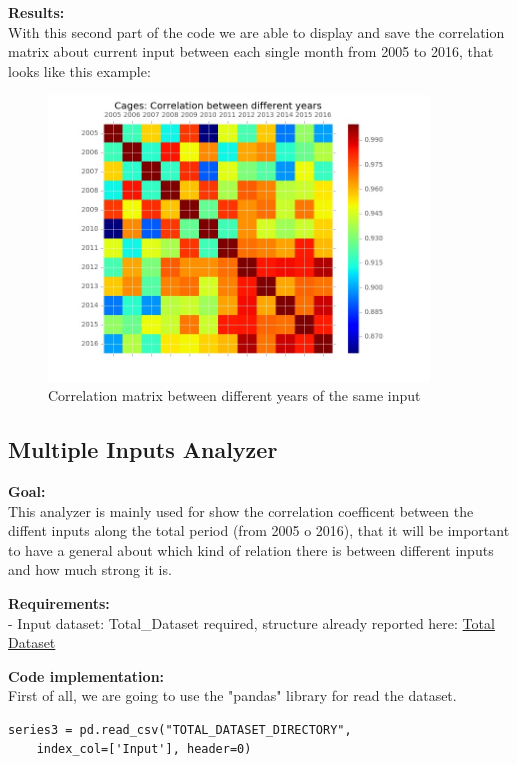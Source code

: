 \begin{minipage}{0.5\textwidth}
\textbf{Results:} \\
With this second part of the code we are able to display and save the correlation matrix about current input between each single month from 2005 to 2016, that looks like this example:
\end{minipage} \hfill
\begin{minipage}{0.45\textwidth}
\begin{figure}[H]
    \includegraphics[width=0.9\textwidth]{Files/Cages_Years_Matrix.jpg}
    \caption{Correlation matrix between different years of the same input}
\end{figure}
\end{minipage}



\newpage
\subsection{Multiple Inputs Analyzer}
\textbf{Goal:}\\
This analyzer is mainly used for show the correlation coefficent between the diffent inputs along the total period (from 2005 o 2016), that it will be important to have a general about which kind of relation there is between different inputs and how much strong it is.

\textbf{Requirements:}\\
- Input dataset: Total\_Dataset required, structure already reported here:
\hyperref[table: Total_Dataset]{Total Dataset}

\textbf{Code implementation:}\\
First of all, we are going to use the "pandas" library for read the dataset.
\begin{lstlisting}
series3 = pd.read_csv("TOTAL_DATASET_DIRECTORY", 
	index_col=['Input'], header=0)
\end{lstlisting}

